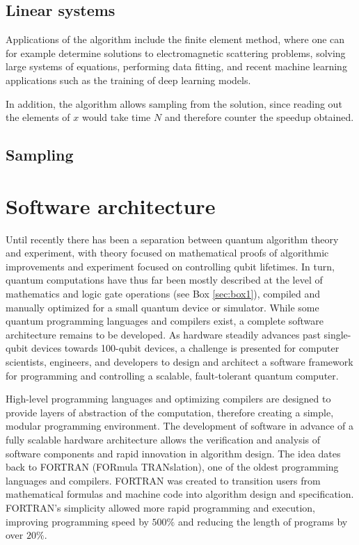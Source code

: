 \documentclass[journal]{IEEEtran}
\begin{document}
\subsection{Linear systems}

Applications of the algorithm include the finite element method, where one can for example determine solutions to electromagnetic scattering problems, solving large systems of equations, performing data fitting, and recent machine learning applications such as the training of deep learning models.

In addition, the algorithm allows sampling from the solution, since reading out the elements of $x$ would take time $N$ and therefore counter the speedup obtained.

\subsection{Sampling}

\section{Software architecture}

Until recently there has been a separation between quantum algorithm theory and experiment, with theory focused on mathematical proofs of algorithmic improvements and experiment focused on controlling qubit lifetimes.  In turn, quantum computations have thus far been mostly described at the level of mathematics and logic gate operations (see Box \ref{sec:box1}), compiled and manually optimized for a small quantum device or simulator.  While some quantum programming languages and compilers exist, a complete software architecture remains to be developed.
As hardware steadily advances past single-qubit devices towards 100-qubit devices, a challenge is presented for computer scientists, engineers, and developers to design and architect a software framework for programming and controlling a scalable, fault-tolerant quantum computer.

 

High-level programming languages and optimizing compilers are designed to provide layers of abstraction of the computation, therefore creating a simple, modular programming environment. The development of software in advance of a fully scalable hardware architecture allows the verification and analysis of software components and rapid innovation in algorithm design.
The idea dates back to FORTRAN \cite{} (FORmula TRANslation), one of the oldest programming languages and compilers.  FORTRAN was created to transition users from mathematical formulas and machine code into algorithm design and specification.  FORTRAN's simplicity allowed more rapid programming and execution, improving programming speed by $500\%$ and reducing the length of programs by over $20\%$.
\end{document}
